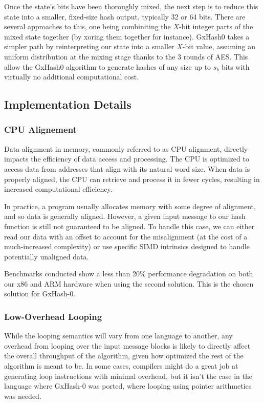 \documentclass[10pt]{article}
\begin{document}
Once the state's bits have been thoroughly mixed, the next step is to reduce this state into a smaller, fixed-size hash output, typically 32 or 64 bits. There are several approaches to this, one being combiniting the \( X \)-bit integer parts of the mixed state together (by xoring them together for instance). GxHash0 takes a simpler path by reinterpreting our state into a smaller \( X \)-bit value, assuming an uniform distribution at the mixing stage thanks to the 3 rounds of AES. This allow the GxHash0 algorithm to generate hashes of any size up to \( s_b \) bits with virtually no additional computational cost.

\subsection{Implementation Details}

\subsubsection{CPU Alignement}

Data alignment in memory, commonly referred to as CPU alignment, directly impacts the efficiency of data access and processing. The CPU is optimized to access data from addresses that align with its natural word size. When data is properly aligned, the CPU can retrieve and process it in fewer cycles, resulting in increased computational efficiency.

In practice, a program usually allocates memory with some degree of alignment, and so data is generally aligned. However, a given input message to our hash function is still not guaranteed to be aligned. To handle this case, we can either read our data with an offset to account for the misalignment (at the cost of a much-increased complexity) or use specific SIMD intrinsics designed to handle potentially unaligned data. 

Benchmarks conducted show a less than 20\% performance degradation on both our x86 and ARM hardware when using the second solution. This is the chosen solution for GxHash-0.

\subsubsection{Low-Overhead Looping}

While the looping semantics will vary from one language to another, any overhead from looping over the input message blocks is likely to directly affect the overall throughput of the algorithm, given how optimized the rest of the algorithm is meant to be. In some cases, compilers might do a great job at generating loop instructions with minimal overhead, but it isn't the case in the language where GxHash-0 was ported, where looping using pointer arithmetics was needed.
\end{document}
